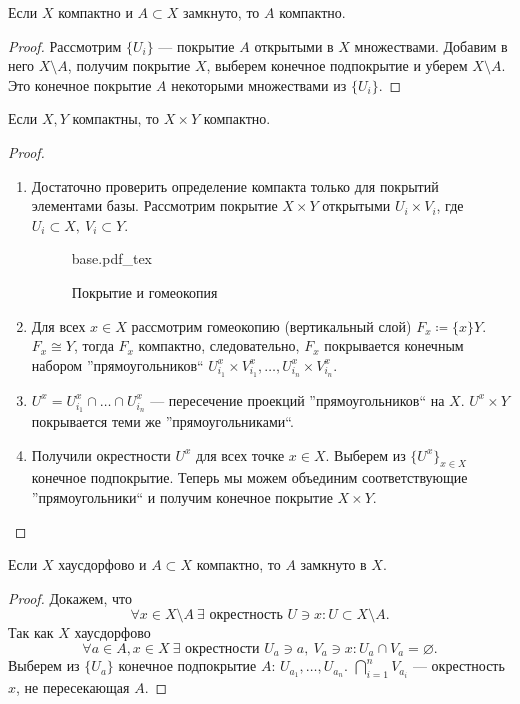 \documentclass[11pt]{book}
\newcommand{\incfig}[1]{%
    \def\svgwidth{\columnwidth}
    {#1.pdf_tex}
}
\theoremstyle{definition}
\theoremstyle{plain}
\theoremstyle{plain}
\theoremstyle{definition}
\theoremstyle{remark}
\begin{document}
\begin{thm}
    Если $ X$ компактно и  $ A \subset X$ замкнуто, то $ A$ компактно.
\end{thm}
\begin{proof}
    Рассмотрим $ \{U_i\}$ --- покрытие  $ A$ открытыми в $ X$ множествами. Добавим в него  $ X \setminus A$, получим покрытие $ X$, выберем конечное подпокрытие и уберем $ X \setminus A$. Это конечное покрытие $ A$ некоторыми множествами из $ \{U_i\}$.
\end{proof}
\begin{thm}
    Если $ X, Y$ компактны, то  $ X \times Y$ компактно.
\end{thm}
\begin{proof}
    $ $
    \begin{enumerate}
	\item Достаточно проверить определение компакта только для покрытий элементами базы. Рассмотрим покрытие $ X \times Y$ открытыми $ U_i \times V_i$, где $ U_i \subset X, ~ V_i \subset Y$.
	    \begin{figure}[ht]
		\centering
		\incfig{base}
		\caption{Покрытие и гомеокопия}
		\label{fig:base}
	    \end{figure}
	\item Для всех $ x \in  X$ рассмотрим гомеокопию (вертикальный слой) $ F_x \coloneqq \{x\} Y$.
	    $ F_x \cong Y$, тогда $F_x$  компактно, следовательно, $ F_x$ покрывается конечным набором ''прямоугольников`` $U_{i_1}^{x}\times V_{i_1}^{x}, \ldots , U_{i_n}^{x}\times V_{i_n}^{x} $.
	\item $ U^{x} = U_{i_1}^{x} \cap \ldots \cap U_{i_n}^{x}$ --- пересечение проекций ''прямоугольников`` на $ X$.  $ U^{x} \times Y$ покрывается теми же ''прямоугольниками``.
	\item Получили окрестности $ U^{x}$ для всех точке $ x \in  X$. Выберем из $ \{U^{x}\}_{x \in  X}$ конечное подпокрытие. Теперь мы можем объединим соответствующие ''прямоугольники`` и получим конечное покрытие $ X \times Y$.
    \end{enumerate}
\end{proof}
\begin{thm}\label{th_xay_komp}
    Если $ X$ хаусдорфово и  $ A \subset X$ компактно, то $ A$ замкнуто в  $ X$.
\end{thm}
\begin{proof}
    Докажем, что
    \[
	\forall x \in  X \setminus A~ \exists \text{ окрестность }U \ni x : U\subset X \setminus A
    .\]
    Так как $ X$ хаусдорфово
    \[
	\forall a \in A, x \in  X ~ \exists \text{ окрестности } U_a \ni a, ~ V_a \ni x: U_a \cap V_a = \varnothing
    .\]
    Выберем из $ \{U_a\}$ конечное подпокрытие $ A$:
    $U_{a_1}, \ldots , U_{a_n}$.
    $ \bigcap_{i=1}^{n} V_{a_i} $ --- окрестность $ x$, не пересекающая  $ A$.
\end{proof}
\end{document}
